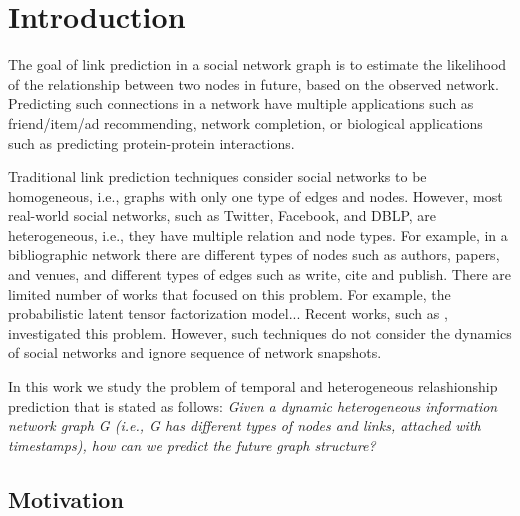 \section{Introduction}
\label{Sec:Introduction}


The goal of link prediction in a social network graph \cite{liben2007link} is to estimate the likelihood of the relationship between two nodes in future, based on the observed network. Predicting such connections in a network have multiple applications such as friend/item/ad recommending, network completion, or biological applications such as predicting protein-protein interactions. 


Traditional link prediction techniques \cite{liben2007link} consider social networks to be homogeneous, i.e., graphs with only one type of edges and nodes. However, most real-world social networks, such as Twitter, Facebook, and DBLP, are heterogeneous, i.e., they have multiple relation and node types. For example, in a bibliographic network there are different types of nodes such as authors, papers, and venues, and different types of edges such as write, cite and publish. There are limited number of works that focused on this problem. For example, the probabilistic latent tensor factorization model... Recent works, such as \cite{sun2011pathsim}, investigated this problem. However, such techniques do not consider the dynamics of social networks and ignore sequence of network snapshots. 
\cite{Zhu2016} \cite{sun2011pathsim} \cite{Sun:2012:HRP:2124295.2124373}  \cite{huang2016meta} \cite{wang2016relsim} \cite{sun2013pathselclus} \cite{sun2011ASONAM} \cite{Yang2012} \cite{liben2007link}


In this work we study the problem of temporal and heterogeneous relashionship prediction that is stated as follows: \textit{Given a dynamic heterogeneous information network graph G (i.e., G has different types of nodes and links, attached with timestamps), how can we predict the future graph structure?}



\subsection{Motivation}

